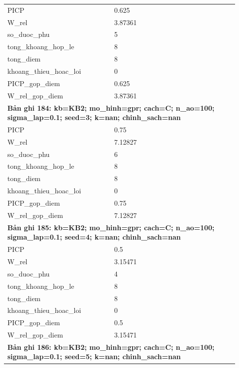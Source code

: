 \begin{longtable}{p{0.43\linewidth}p{0.50\linewidth}}
PICP & 0.625 \\
W\_\allowbreak rel & 3.87361 \\
so\_\allowbreak duoc\_\allowbreak phu & 5 \\
tong\_\allowbreak khoang\_\allowbreak hop\_\allowbreak le & 8 \\
tong\_\allowbreak diem & 8 \\
khoang\_\allowbreak thieu\_\allowbreak hoac\_\allowbreak loi & 0 \\
PICP\_\allowbreak gop\_\allowbreak diem & 0.625 \\
W\_\allowbreak rel\_\allowbreak gop\_\allowbreak diem & 3.87361 \\
\midrule
\multicolumn{2}{p{0.95\linewidth}}{\textbf{Bản ghi 184: kb=KB2; mo\_hinh=gpr; cach=C; n\_ao=100; sigma\_lap=0.1; seed=3; k=nan; chinh\_sach=nan}} \\
PICP & 0.75 \\
W\_\allowbreak rel & 7.12827 \\
so\_\allowbreak duoc\_\allowbreak phu & 6 \\
tong\_\allowbreak khoang\_\allowbreak hop\_\allowbreak le & 8 \\
tong\_\allowbreak diem & 8 \\
khoang\_\allowbreak thieu\_\allowbreak hoac\_\allowbreak loi & 0 \\
PICP\_\allowbreak gop\_\allowbreak diem & 0.75 \\
W\_\allowbreak rel\_\allowbreak gop\_\allowbreak diem & 7.12827 \\
\midrule
\multicolumn{2}{p{0.95\linewidth}}{\textbf{Bản ghi 185: kb=KB2; mo\_hinh=gpr; cach=C; n\_ao=100; sigma\_lap=0.1; seed=4; k=nan; chinh\_sach=nan}} \\
PICP & 0.5 \\
W\_\allowbreak rel & 3.15471 \\
so\_\allowbreak duoc\_\allowbreak phu & 4 \\
tong\_\allowbreak khoang\_\allowbreak hop\_\allowbreak le & 8 \\
tong\_\allowbreak diem & 8 \\
khoang\_\allowbreak thieu\_\allowbreak hoac\_\allowbreak loi & 0 \\
PICP\_\allowbreak gop\_\allowbreak diem & 0.5 \\
W\_\allowbreak rel\_\allowbreak gop\_\allowbreak diem & 3.15471 \\
\midrule
\multicolumn{2}{p{0.95\linewidth}}{\textbf{Bản ghi 186: kb=KB2; mo\_hinh=gpr; cach=C; n\_ao=100; sigma\_lap=0.1; seed=5; k=nan; chinh\_sach=nan}} \\

\end{longtable}
